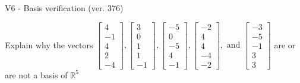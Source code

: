 \begin{exercise}
  \begin{exerciseTitle}V6 - Basis verification (ver. 376)\end{exerciseTitle}
  \begin{exerciseStatement}
    Explain why the vectors \(\left[\begin{array}{r}
4 \\
-1 \\
4 \\
2 \\
-4
\end{array}\right] , \left[\begin{array}{r}
3 \\
0 \\
1 \\
1 \\
-1
\end{array}\right] , \left[\begin{array}{r}
-5 \\
0 \\
-5 \\
4 \\
-1
\end{array}\right] , \left[\begin{array}{r}
-2 \\
4 \\
4 \\
-4 \\
-2
\end{array}\right] , \text{ and } \left[\begin{array}{r}
-3 \\
-5 \\
-1 \\
3 \\
3
\end{array}\right]\) are or are not a basis of \(\mathbb{R}^5\)	



\end{exerciseStatement}
\end{exercise}
